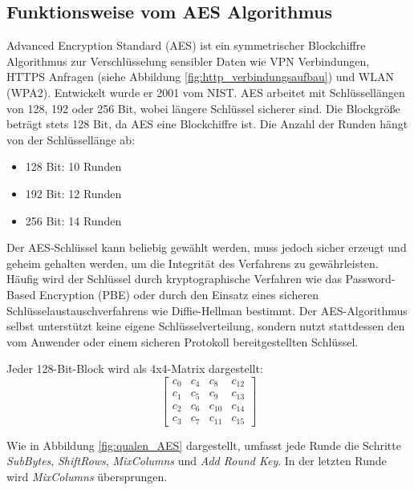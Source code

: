 \subsection{Funktionsweise vom AES Algorithmus}
\label{sec:aes}
\setlength{\parindent}{0pt}

Advanced Encryption Standard (AES) ist ein symmetrischer Blockchiffre Algorithmus zur 
Verschlüsselung sensibler Daten wie VPN Verbindungen, HTTPS Anfragen 
(siehe Abbildung \ref{fig:http_verbindungsaufbau}) und WLAN (WPA2). 
Entwickelt wurde er 2001 vom NIST. AES arbeitet mit Schlüssellängen von 128, 192 oder 256 Bit, 
wobei längere Schlüssel sicherer sind. Die Blockgröße beträgt stets 128 Bit, da AES eine Blockchiffre 
ist. Die Anzahl der Runden hängt von der Schlüssellänge ab: 
\begin{itemize}
    \item 128 Bit: 10 Runden
    \item 192 Bit: 12 Runden
    \item 256 Bit: 14 Runden
\end{itemize}
Der AES-Schlüssel kann beliebig gewählt werden, muss jedoch sicher erzeugt und geheim gehalten werden, um 
die Integrität des Verfahrens zu gewährleisten. Häufig wird der Schlüssel durch kryptographische Verfahren 
wie das Password-Based Encryption (PBE) oder durch den Einsatz eines sicheren Schlüsselaustauschverfahrens 
wie Diffie-Hellman bestimmt. Der AES-Algorithmus selbst unterstützt keine eigene Schlüsselverteilung, sondern 
nutzt stattdessen den vom Anwender oder einem sicheren Protokoll bereitgestellten Schlüssel.


Jeder 128-Bit-Block wird als 4x4-Matrix dargestellt:
\[
\begin{bmatrix}
c_0  & c_4  & c_8  & c_{12} \\
c_1  & c_5  & c_9  & c_{13} \\
c_2  & c_6  & c_{10} & c_{14} \\
c_3  & c_7  & c_{11} & c_{15}
\end{bmatrix}
\]

Wie in Abbildung \ref{fig:qualen_AES} dargestellt, umfasst jede Runde die Schritte \textit{SubBytes}, \textit{ShiftRows}, \textit{MixColumns} und \textit{Add Round Key}. 
In der letzten Runde wird \textit{MixColumns} über\-sprungen.\cite{AES_Algorithmus_2}\cite{AES_Algorithmus_3}\cite{AES_Algorithmus}\cite{Blockchiffre}

